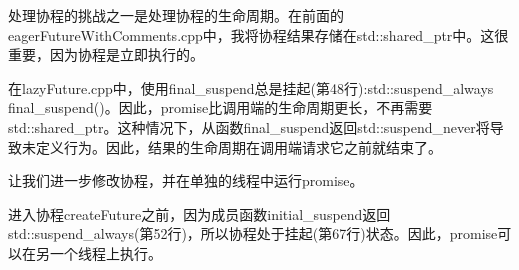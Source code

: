 \begin{tcolorbox}[breakable,enhanced jigsaw,colback=red!5!white,colframe=red!75!black,title={关于数据}]
处理协程的挑战之一是处理协程的生命周期。在前面的eagerFutureWithComments.cpp中，我将协程结果存储在std::shared\_ptr中。这很重要，因为协程是立即执行的。

在lazyFuture.cpp中，使用final\_suspend总是挂起(第48行):std::suspend\_always final\_suspend()。因此，promise比调用端的生命周期更长，不再需要std::shared\_ptr。这种情况下，从函数final\_suspend返回std::suspend\_never将导致未定义行为。因此，结果的生命周期在调用端请求它之前就结束了。
\end{tcolorbox}

让我们进一步修改协程，并在单独的线程中运行promise。


进入协程createFuture之前，因为成员函数initial\_suspend返回std::suspend\_always(第52行)，所以协程处于挂起(第67行)状态。因此，promise可以在另一个线程上执行。

